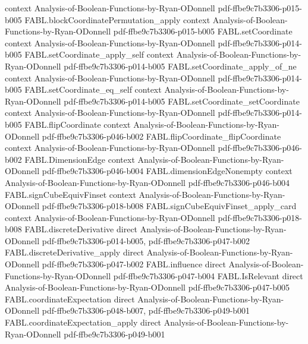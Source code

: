 \begin{theorem}
  {context}
  {Analysis-of-Boolean-Functions-by-Ryan-ODonnell}
  {pdf-ffbe9c7b3306-p015-b005}
\proofstep
  {FABL.blockCoordinatePermutation_apply}
  {context}
  {Analysis-of-Boolean-Functions-by-Ryan-ODonnell}
  {pdf-ffbe9c7b3306-p015-b005}
\proofstep
  {FABL.setCoordinate}
  {context}
  {Analysis-of-Boolean-Functions-by-Ryan-ODonnell}
  {pdf-ffbe9c7b3306-p014-b005}
\proofstep
  {FABL.setCoordinate_apply_self}
  {context}
  {Analysis-of-Boolean-Functions-by-Ryan-ODonnell}
  {pdf-ffbe9c7b3306-p014-b005}
\proofstep
  {FABL.setCoordinate_apply_of_ne}
  {context}
  {Analysis-of-Boolean-Functions-by-Ryan-ODonnell}
  {pdf-ffbe9c7b3306-p014-b005}
\proofstep
  {FABL.setCoordinate_eq_self}
  {context}
  {Analysis-of-Boolean-Functions-by-Ryan-ODonnell}
  {pdf-ffbe9c7b3306-p014-b005}
\proofstep
  {FABL.setCoordinate_setCoordinate}
  {context}
  {Analysis-of-Boolean-Functions-by-Ryan-ODonnell}
  {pdf-ffbe9c7b3306-p014-b005}
\proofstep
  {FABL.flipCoordinate}
  {context}
  {Analysis-of-Boolean-Functions-by-Ryan-ODonnell}
  {pdf-ffbe9c7b3306-p046-b002}
\proofstep
  {FABL.flipCoordinate_flipCoordinate}
  {context}
  {Analysis-of-Boolean-Functions-by-Ryan-ODonnell}
  {pdf-ffbe9c7b3306-p046-b002}
\proofstep
  {FABL.DimensionEdge}
  {context}
  {Analysis-of-Boolean-Functions-by-Ryan-ODonnell}
  {pdf-ffbe9c7b3306-p046-b004}
\proofstep
  {FABL.dimensionEdgeNonempty}
  {context}
  {Analysis-of-Boolean-Functions-by-Ryan-ODonnell}
  {pdf-ffbe9c7b3306-p046-b004}
\proofstep
  {FABL.signCubeEquivFinset}
  {context}
  {Analysis-of-Boolean-Functions-by-Ryan-ODonnell}
  {pdf-ffbe9c7b3306-p018-b008}
\proofstep
  {FABL.signCubeEquivFinset_apply_card}
  {context}
  {Analysis-of-Boolean-Functions-by-Ryan-ODonnell}
  {pdf-ffbe9c7b3306-p018-b008}
\proofstep
  {FABL.discreteDerivative}
  {direct}
  {Analysis-of-Boolean-Functions-by-Ryan-ODonnell}
  {pdf-ffbe9c7b3306-p014-b005,
    pdf-ffbe9c7b3306-p047-b002}
\proofstep
  {FABL.discreteDerivative_apply}
  {direct}
  {Analysis-of-Boolean-Functions-by-Ryan-ODonnell}
  {pdf-ffbe9c7b3306-p047-b002}
\proofstep
  {FABL.influence}
  {direct}
  {Analysis-of-Boolean-Functions-by-Ryan-ODonnell}
  {pdf-ffbe9c7b3306-p047-b004}
\proofstep
  {FABL.IsRelevant}
  {direct}
  {Analysis-of-Boolean-Functions-by-Ryan-ODonnell}
  {pdf-ffbe9c7b3306-p047-b005}
\proofstep
  {FABL.coordinateExpectation}
  {direct}
  {Analysis-of-Boolean-Functions-by-Ryan-ODonnell}
  {pdf-ffbe9c7b3306-p048-b007,
    pdf-ffbe9c7b3306-p049-b001}
\proofstep
  {FABL.coordinateExpectation_apply}
  {direct}
  {Analysis-of-Boolean-Functions-by-Ryan-ODonnell}
  {pdf-ffbe9c7b3306-p049-b001}
\proofstep

\end{theorem}

